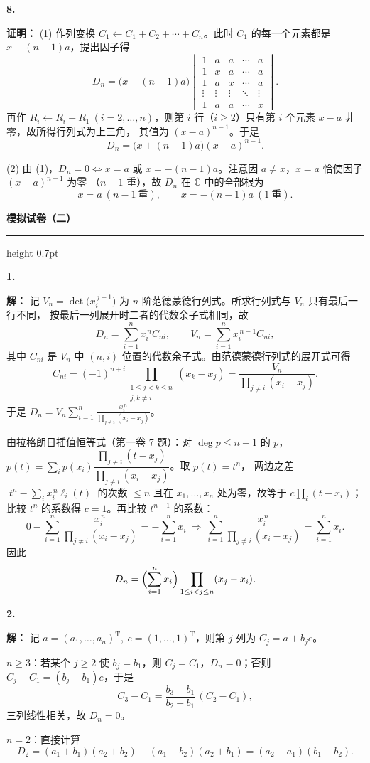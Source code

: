 \documentclass[11pt,a4paper,fontset=windows]{ctexart}
\newcommand{\paperhead}[1]{\Needspace{10\baselineskip}\par\vspace{16pt}%
  {\Large\bfseries\songti #1}\par\vspace{3pt}\hrule height 0.7pt\par\vspace{8pt}}
\newcommand{\sola}[2]{\Needspace{4\baselineskip}\par\vspace{10pt}%
  \noindent\textbf{#1}\hspace{0.45em}{\small\color{hdgray}\songti #2}\par\vspace{1pt}}
\newcommand{\pf}{\textbf{证明：}}
\newcommand{\sd}{\textbf{解：}}
\begin{document}
\sola{8.}{（15 分）}\pf
(1) 作列变换 $C_1\leftarrow C_1+C_2+\cdots+C_n$。此时 $C_1$ 的每一个元素都是 $x+(n-1)a$，提出因子得
\[
D_n=\bigl(x+(n-1)a\bigr)\begin{vmatrix}
1&a&a&\cdots&a\\
1&x&a&\cdots&a\\
1&a&x&\cdots&a\\
\vdots&\vdots&\vdots&\ddots&\vdots\\
1&a&a&\cdots&x
\end{vmatrix}.
\]
再作 $R_i\leftarrow R_i-R_1\ (i=2,\dots,n)$，则第 $i$ 行（$i\ge2$）只有第 $i$ 个元素 $x-a$ 非零，故所得行列式为上三角，
其值为 $(x-a)^{n-1}$。于是
\[
D_n=\bigl(x+(n-1)a\bigr)(x-a)^{n-1}.
\]
\par
(2) 由 (1)，$D_n=0\iff x=a$ 或 $x=-(n-1)a$。注意因 $a\neq x$，$x=a$ 恰使因子 $(x-a)^{n-1}$ 为零
（$n-1$ 重），故 $D_n$ 在 $\mathbb{C}$ 中的全部根为
\[
x=a\ (n-1\ \text{重}),\qquad x=-(n-1)a\ (1\ \text{重}).
\]

\paperhead{模拟试卷（二）}

\sola{1.}{（10 分）}\sd
记 $V_n=\det\bigl(x_i^{\,j-1}\bigr)$ 为 $n$ 阶范德蒙德行列式。所求行列式与 $V_n$ 只有最后一行不同，
按最后一列展开时二者的代数余子式相同，故
\[
D_n=\sum_{i=1}^{n}x_i^{\,n}C_{ni},\qquad V_n=\sum_{i=1}^{n}x_i^{\,n-1}C_{ni},
\]
其中 $C_{ni}$ 是 $V_n$ 中 $(n,i)$ 位置的代数余子式。由范德蒙德行列式的展开式可得
\[
C_{ni}=(-1)^{n+i}\prod_{\substack{1\le j<k\le n\\ j,k\neq i}}(x_k-x_j)
=\frac{V_n}{\prod_{j\neq i}(x_i-x_j)} .
\]
于是 $D_n=V_n\displaystyle\sum_{i=1}^{n}\frac{x_i^{\,n}}{\prod_{j\neq i}(x_i-x_j)}$。
\par
由拉格朗日插值恒等式（第一卷 7 题）：对 $\deg p\le n-1$ 的 $p$，
$p(t)=\sum_i p(x_i)\dfrac{\prod_{j\neq i}(t-x_j)}{\prod_{j\neq i}(x_i-x_j)}$。取 $p(t)=t^{n}$，
两边之差 $\;t^{n}-\sum_i x_i^{\,n}\ell_i(t)\;$ 的次数 $\le n$ 且在 $x_1,\dots,x_n$ 处为零，故等于 $c\prod_i(t-x_i)$；
比较 $t^{n}$ 的系数得 $c=1$。再比较 $t^{n-1}$ 的系数：
\[
0-\sum_{i=1}^{n}\frac{x_i^{\,n}}{\prod_{j\neq i}(x_i-x_j)}=-\sum_{i=1}^{n}x_i
\ \Longrightarrow\
\sum_{i=1}^{n}\frac{x_i^{\,n}}{\prod_{j\neq i}(x_i-x_j)}=\sum_{i=1}^{n}x_i .
\]
因此
\[
D_n=\Bigl(\sum_{i=1}^{n}x_i\Bigr)\prod_{1\le i<j\le n}(x_j-x_i).
\]

\sola{2.}{（10 分）}\sd
记 $a=(a_1,\dots,a_n)^{\mathrm T},\ e=(1,\dots,1)^{\mathrm T}$，则第 $j$ 列为 $C_j=a+b_je$。
\par
$n\ge3$：若某个 $j\ge2$ 使 $b_j=b_1$，则 $C_j=C_1$，$D_n=0$；否则
$C_j-C_1=(b_j-b_1)e$，于是
\[
C_3-C_1=\frac{b_3-b_1}{b_2-b_1}\,(C_2-C_1),
\]
三列线性相关，故 $D_n=0$。
\par
$n=2$：直接计算
\[
D_2=(a_1+b_1)(a_2+b_2)-(a_1+b_2)(a_2+b_1)=(a_2-a_1)(b_1-b_2).
\]
\end{document}
